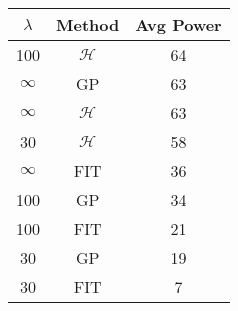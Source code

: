 \centering \begin{tabular}{c|c|c}
$\lambda$	&Method	&Avg Power\\\hline
100	&$\mathcal{H}$	&64\\
$\infty$	&GP	&63\\
$\infty$	&$\mathcal{H}$	&63\\
30	&$\mathcal{H}$	&58\\
$\infty$	&FIT	&36\\
100	&GP	&34\\
100	&FIT	&21\\
30	&GP	&19\\
30	&FIT	&7\\
\end{tabular}
